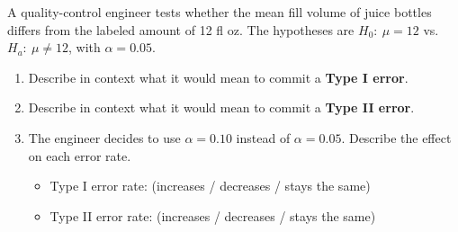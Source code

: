 \documentclass[10pt]{article}
\begin{document}
\namedateperiod

\vspace{0.1in}
A quality-control engineer tests whether the mean fill volume of juice bottles differs
from the labeled amount of 12 fl oz. The hypotheses are $H_0{:}\ \mu = 12$ vs.\
$H_a{:}\ \mu \ne 12$, with $\alpha = 0.05$.

\begin{enumerate}

  \item Describe in context what it would mean to commit a \textbf{Type I error}.


  \item Describe in context what it would mean to commit a \textbf{Type II error}.


  \item The engineer decides to use $\alpha = 0.10$ instead of $\alpha = 0.05$.
        Describe the effect on each error rate.

        \begin{itemize}
            \item Type I error rate: \blank{5cm} (increases / decreases / stays the same)
            \item Type II error rate: \blank{5cm} (increases / decreases / stays the same)
        \end{itemize}

\end{enumerate}
\end{document}
